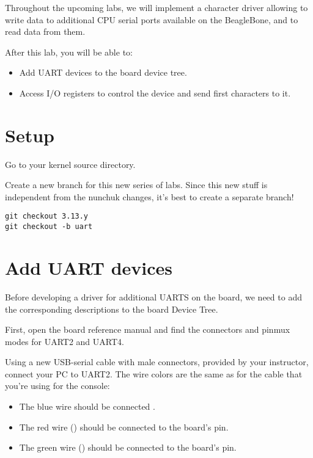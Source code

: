 
Throughout the upcoming labs, we will implement a character driver
allowing to write data to additional CPU serial ports available on
the BeagleBone, and to read data from them.

After this lab, you will be able to:

\begin{itemize}
\item Add UART devices to the board device tree.
\item Access I/O registers to control the device and
      send first characters to it.
\end{itemize}

\section{Setup}

Go to your kernel source directory.

Create a new branch for this new series of labs. Since this new stuff
is independent from the nunchuk changes, it's best to create a separate
branch!

\begin{verbatim}
git checkout 3.13.y
git checkout -b uart
\end{verbatim}

\section{Add UART devices}

Before developing a driver for additional UARTS on the board, we
need to add the corresponding descriptions to the board Device Tree.

First, open the board reference manual and find the connectors
and pinmux modes for UART2 and UART4.

Using a new USB-serial cable with male connectors, provided by your
instructor, connect your PC to UART2. The wire colors are the same
as for the cable that you're using for the console:

\begin{itemize}
\item The blue wire should be connected .
\item The red wire () should be connected to the board's  pin.
\item The green wire () should be connected to the board's  pin.
\end{itemize}

